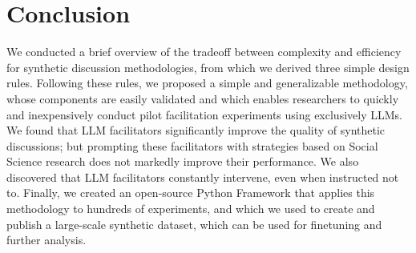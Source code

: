 %
\section{Conclusion}

We conducted a brief overview of the tradeoff between complexity and efficiency for synthetic discussion methodologies, from which we derived three simple design rules. Following these rules, we proposed a simple and generalizable methodology, whose components are easily validated and which enables researchers to quickly and inexpensively conduct pilot facilitation experiments using exclusively LLMs. We found that LLM facilitators significantly improve the quality of synthetic discussions; but prompting these facilitators with strategies based on Social Science research does not markedly improve their performance. We also discovered that LLM facilitators constantly intervene, even when instructed not to. Finally, we created an open-source Python Framework that applies this methodology to hundreds of experiments, and which we used to create and publish a large-scale synthetic dataset, which can be used for finetuning and further analysis.